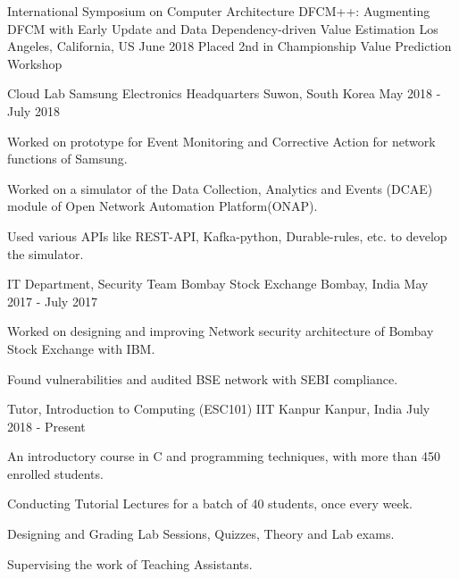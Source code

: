 \documentclass[12pt, a4paper]{awesome-cv}
\begin{document}
\begin{cventries}
    \cventry
    {International Symposium on Computer Architecture}
    {DFCM++: Augmenting DFCM with Early Update and Data Dependency-driven Value Estimation}
    {Los Angeles, California, US}
    {June 2018}
    {Placed 2nd in Championship Value Prediction Workshop}
\end{cventries}

\begin{cventries}
    \cventry
    {Cloud Lab}
    {Samsung Electronics Headquarters}
    {Suwon, South Korea}
    {May 2018 - July 2018}
    {
        \begin{cvitems}
        \item Worked on prototype for Event Monitoring and Corrective Action for network functions of Samsung.
        \item Worked on a simulator of the Data Collection, Analytics and Events (DCAE) module of Open Network Automation Platform(ONAP).
        \item Used various APIs like REST-API, Kafka-python, Durable-rules, etc. to develop the simulator.
        \end{cvitems}
    }

    \cventry
    {IT Department, Security Team}
    {Bombay Stock Exchange}
    {Bombay, India}
    {May 2017 - July 2017}
    {
        \begin{cvitems}
            \item Worked on designing and improving Network security architecture of Bombay Stock Exchange with IBM. 
            \item Found vulnerabilities and audited BSE network with SEBI compliance. 
        \end{cvitems}
    }

    \cventry
    {Tutor, Introduction to Computing (ESC101)}
    {IIT Kanpur}
    {Kanpur, India}
    {July 2018 - Present}
    {
        \begin{cvitems}
            \item An introductory course in C and programming techniques, with more than 450 enrolled students.
            \item Conducting Tutorial Lectures for a batch of 40 students, once every week.
            \item Designing and Grading Lab Sessions, Quizzes, Theory and Lab exams.
            \item Supervising the work of Teaching Assistants.
        \end{cvitems}
    }
\end{cventries}
\end{document}

